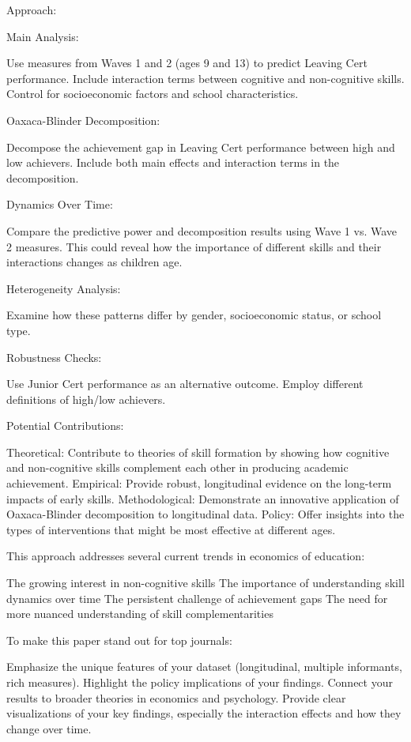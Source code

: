 \documentclass[12pt,a4paper,onecolumn]{article}
\numberwithin{equation}{section}
\begin{document}
Approach:

Main Analysis:

Use measures from Waves 1 and 2 (ages 9 and 13) to predict Leaving Cert performance.
Include interaction terms between cognitive and non-cognitive skills.
Control for socioeconomic factors and school characteristics.


Oaxaca-Blinder Decomposition:

Decompose the achievement gap in Leaving Cert performance between high and low achievers.
Include both main effects and interaction terms in the decomposition.


Dynamics Over Time:

Compare the predictive power and decomposition results using Wave 1 vs. Wave 2 measures.
This could reveal how the importance of different skills and their interactions changes as children age.


Heterogeneity Analysis:

Examine how these patterns differ by gender, socioeconomic status, or school type.


Robustness Checks:

Use Junior Cert performance as an alternative outcome.
Employ different definitions of high/low achievers.



Potential Contributions:

Theoretical: Contribute to theories of skill formation by showing how cognitive and non-cognitive skills complement each other in producing academic achievement.
Empirical: Provide robust, longitudinal evidence on the long-term impacts of early skills.
Methodological: Demonstrate an innovative application of Oaxaca-Blinder decomposition to longitudinal data.
Policy: Offer insights into the types of interventions that might be most effective at different ages.

This approach addresses several current trends in economics of education:

The growing interest in non-cognitive skills
The importance of understanding skill dynamics over time
The persistent challenge of achievement gaps
The need for more nuanced understanding of skill complementarities

To make this paper stand out for top journals:

Emphasize the unique features of your dataset (longitudinal, multiple informants, rich measures).
Highlight the policy implications of your findings.
Connect your results to broader theories in economics and psychology.
Provide clear visualizations of your key findings, especially the interaction effects and how they change over time.
\end{document}
